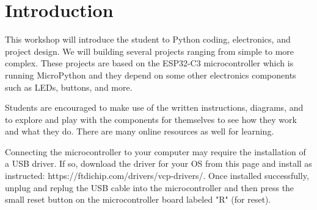 \chapter{Introduction}
This workshop will introduce the student to Python coding, electronics, and project
design. We will building several projects ranging from simple to more complex. These
projects are based on the ESP32-C3 microcontroller which is running MicroPython and
they depend on some other electronics components such as LEDs, buttons, and more.

Students are encouraged to make use of the written instructions, diagrams, and to
explore and play with the components for themselves to see how they work and what
they do. There are many online resources as well for learning.

Connecting the microcontroller to your computer may require the installation of a
USB driver. If so, download the driver for your OS from this page and install as instructed:
https://ftdichip.com/drivers/vcp-drivers/. Once installed successfully, unplug and replug
the USB cable into the microcontroller and then press the small reset button on the
microcontroller board labeled "R" (for reset).
